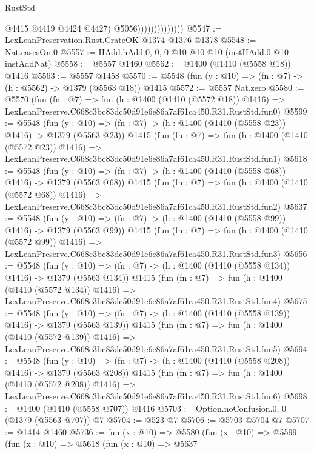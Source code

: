 \begin{lexlean}{RustStd}
\begin{coremodule}
                                  @4415
                                  @4419
                                  @4424
                                  @4427)
                                @5056))))))))))))))
@5547 := LexLeanPreservation.Rust.CrateOK @1374 @1376 @1378
@5548 := Nat.casesOn.{0}
@5557 := HAdd.hAdd.{0, 0, 0} @10 @10 @10 (instHAdd.{0} @10 instAddNat)
@5558 := @5557 @1460
@5562 := @1400 (@1410 (@5558 @18)) @1416
@5563 := @5557 @1458
@5570 := @5548 (fun (y : @10) => (fn : @7) -> (h : @5562) -> @1379 (@5563 @18)) @1415
@5572 := @5557 Nat.zero
@5580 := @5570
    (fun (fn : @7) =>
    fun (h : @1400 (@1410 (@5572 @18)) @1416) =>
    LexLeanPreserve.C668c3bc83dc50d91e6e86a7af61ca450.R31.RustStd.fun0)
@5599 := @5548
    (fun (y : @10) => (fn : @7) -> (h : @1400 (@1410 (@5558 @23)) @1416) -> @1379 (@5563 @23))
    @1415
    (fun (fn : @7) =>
    fun (h : @1400 (@1410 (@5572 @23)) @1416) =>
    LexLeanPreserve.C668c3bc83dc50d91e6e86a7af61ca450.R31.RustStd.fun1)
@5618 := @5548
    (fun (y : @10) => (fn : @7) -> (h : @1400 (@1410 (@5558 @68)) @1416) -> @1379 (@5563 @68))
    @1415
    (fun (fn : @7) =>
    fun (h : @1400 (@1410 (@5572 @68)) @1416) =>
    LexLeanPreserve.C668c3bc83dc50d91e6e86a7af61ca450.R31.RustStd.fun2)
@5637 := @5548
    (fun (y : @10) => (fn : @7) -> (h : @1400 (@1410 (@5558 @99)) @1416) -> @1379 (@5563 @99))
    @1415
    (fun (fn : @7) =>
    fun (h : @1400 (@1410 (@5572 @99)) @1416) =>
    LexLeanPreserve.C668c3bc83dc50d91e6e86a7af61ca450.R31.RustStd.fun3)
@5656 := @5548
    (fun (y : @10) => (fn : @7) -> (h : @1400 (@1410 (@5558 @134)) @1416) -> @1379 (@5563 @134))
    @1415
    (fun (fn : @7) =>
    fun (h : @1400 (@1410 (@5572 @134)) @1416) =>
    LexLeanPreserve.C668c3bc83dc50d91e6e86a7af61ca450.R31.RustStd.fun4)
@5675 := @5548
    (fun (y : @10) => (fn : @7) -> (h : @1400 (@1410 (@5558 @139)) @1416) -> @1379 (@5563 @139))
    @1415
    (fun (fn : @7) =>
    fun (h : @1400 (@1410 (@5572 @139)) @1416) =>
    LexLeanPreserve.C668c3bc83dc50d91e6e86a7af61ca450.R31.RustStd.fun5)
@5694 := @5548
    (fun (y : @10) => (fn : @7) -> (h : @1400 (@1410 (@5558 @208)) @1416) -> @1379 (@5563 @208))
    @1415
    (fun (fn : @7) =>
    fun (h : @1400 (@1410 (@5572 @208)) @1416) =>
    LexLeanPreserve.C668c3bc83dc50d91e6e86a7af61ca450.R31.RustStd.fun6)
@5698 := @1400 (@1410 (@5558 @707)) @1416
@5703 := Option.noConfusion.{0, 0} (@1379 (@5563 @707)) @7
@5704 := @523 @7
@5706 := @5703 @5704 @7
@5707 := @1414 @1460
@5736 := fun (x : @10) =>
  @5580
    (fun (x : @10) =>
    @5599
      (fun (x : @10) =>
      @5618
        (fun (x : @10) =>
        @5637

\end{coremodule}
\end{lexlean}
